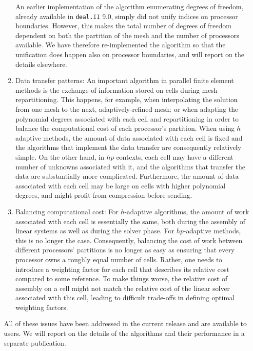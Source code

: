 \documentclass{ansarticle-preprint}
\newcommand{\specialword}[1]{\texttt{#1}}
\newcommand{\dealii}{{\specialword{deal.II}}\xspace}
\begin{document}
\begin{enumerate}
  An earlier implementation of the algorithm enumerating degrees of
  freedom, already available in \dealii{} 9.0, simply did not unify
  indices on processor boundaries. However, this makes the total
  number of degrees of freedom dependent on both the partition of the
  mesh and the number of processors available. We have therefore
  re-implemented the algorithm so that the unification does happen
  also on processor boundaries, and will report on the details
  elsewhere.

\item Data transfer patterns: An important algorithm in parallel
  finite element methods is the exchange of information stored on
  cells during mesh repartitioning. This happens, for example, when
  interpolating the solution from one mesh to the next,
  adaptively-refined mesh; or when adapting the polynomial degrees
  associated with each cell and repartitioning in order to
  balance the computational cost of each processor's partition. When
  using $h$ adaptive methods, the amount of data associated with each
  cell is fixed and the algorithms that implement the data transfer
  are consequently relatively simple. On the other hand, in $hp$
  contexts, each cell may have a different number of unknowns
  associated with it, and the algorithms that transfer the data are
  substantially more complicated. Furthermore, the amount of data
  associated with each cell may be large on cells with higher
  polynomial degrees, and might profit from compression before
  sending.

\item Balancing computational cost: For $h$-adaptive algorithms, the
  amount of work associated with each cell is essentially the same,
  both during the assembly of linear systems as well as during the
  solver phase. For $hp$-adaptive methods, this is no longer the
  case. Consequently, balancing the cost of work between different
  processors' partitions is no longer as easy as ensuring that every
  processor owns a roughly equal number of cells. Rather, one needs to
  introduce a weighting factor for each cell that describes its
  relative cost compared to some reference. To make things worse, the
  relative cost of assembly on a cell might not match the relative
  cost of the linear solver associated with this cell, leading to
  difficult trade-offs in defining optimal weighting factors.
\end{enumerate}

All of these issues have been addressed in the current release and are
available to users. We will report on the details of the algorithms
and their performance in a separate publication.
\end{document}
